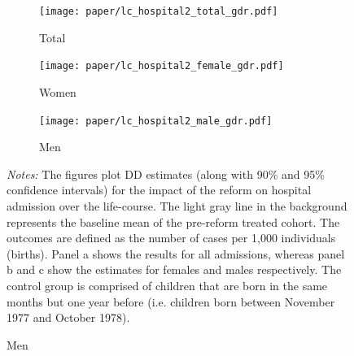 \documentclass[11pt, a4paper]{article} %
\begin{document}
\newpage
\begin{landscape}
	\vspace*{\fill}
	\begin{figure}[H]\centering
		\caption{Life-course approach for \textbf{hospital admission}}\label{fig: lc_hospital2_frg_DD}
		\begin{subfigure}[h]{0.31\linewidth}\centering\caption{Total}
			\texttt{[image: paper/lc\_hospital2\_total\_gdr.pdf]}
		\end{subfigure}
		\begin{subfigure}[h]{0.31\linewidth}\centering\caption{Women}
			\texttt{[image: paper/lc\_hospital2\_female\_gdr.pdf]}
		\end{subfigure}
		\begin{subfigure}[h]{0.31\linewidth}\centering\caption{Men}
			\texttt{[image: paper/lc\_hospital2\_male\_gdr.pdf]}
		\end{subfigure}
		\scriptsize
		\begin{minipage}{\linewidth}
			\emph{Notes:} The figures plot DD estimates (along with 90\% and 95\% confidence intervals) for the impact of the reform on hospital admission over the life-course. The light gray line in the background represents the baseline mean of the pre-reform treated cohort. The outcomes are defined as the number of cases per 1,000 individuals (births). Panel a shows the results for all admissions, whereas panel b and c show the estimates for females and males respectively. The control group is comprised of children	that are born in the same months but one year before (i.e. children born between November 1977 and October 1978).
		\end{minipage}
	\end{figure}
	\vspace*{\fill}\clearpage
\end{landscape}
%

\end{document}

